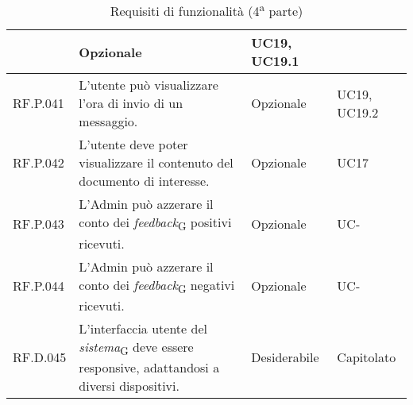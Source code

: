 \begin{table}[H]
\begin{tabular}{|C{2.7cm}|L{7.2cm}|C{2.7cm}|C{2cm}|}
         & Opzionale & UC19, UC19.1 \\
        \hline
        RF.P.041 & L’utente può visualizzare l'ora di invio di un messaggio.
         & Opzionale & UC19, UC19.2 \\
        \hline
        RF.P.042 & L’utente deve poter visualizzare il contenuto del documento di interesse.
         & Opzionale & UC17 \\
        \hline
        RF.P.043 & L'Admin può azzerare il conto dei \textit{feedback}\textsubscript{G} positivi ricevuti.
         & Opzionale & UC- \\
        \hline
        RF.P.044 & L'Admin può azzerare il conto dei \textit{feedback}\textsubscript{G} negativi ricevuti.
         & Opzionale & UC- \\
        \hline
        RF.D.045 & L'interfaccia utente del \textit{sistema}\textsubscript{G} deve essere responsive, adattandosi a diversi dispositivi. & Desiderabile & Capitolato \\
        \hline
    \end{tabular}
    \caption{Requisiti di funzionalità (4\textsuperscript{a}  parte)}
\end{table}

\newpage